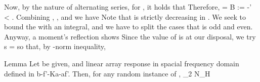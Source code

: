 Now, by the nature of alternating series, for , it holds that
%
Therefore,
%
 {
\NC {}
= \NC {} {} \NR
%
\NC \leq \NC B  \NR
%
\NC := \NC {} { } \NR
%
\NC -\pi \leq \NC \psi' < \pi. \NR
}
%
Combining , , and  we have
%
%
Note that  is strictly decreasing in .
We seek to bound the  with an integral, and we have to split the cases that  is odd and even.
Anyway, a moment's reflection shows
%
%
Since the value of  is at our disposal, we try
%
 {
\NC s
=\NC {} \NR
}
%
so that, by -norm inequality, 

\Result
{Lemma}
{
Let \m {\f } be given, and linear array response in spacial frequency domain  defined in {b-f'-Ka-af'}.
Then, for any random instance of \m {\f},
%
 {
\NC {} _2
\leq \NC {} {\pi} \log N_H \NR
}
}

\stopsubsection

\startsubsection [title={Norm of Angular Channel Response}]

